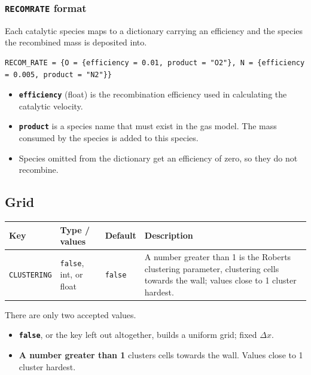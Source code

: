 \documentclass[10pt,a4paper]{article}
\renewcommand{\_}{\origunderscore\penalty4000\relax}
\begin{document}
\subsubsection*{\texttt{RECOM\_RATE} format}

Each catalytic species maps to a dictionary carrying an efficiency and the species the recombined mass is deposited into.

\begin{lstlisting}
RECOM_RATE = {O = {efficiency = 0.01, product = "O2"}, N = {efficiency = 0.005, product = "N2"}}
\end{lstlisting}

\begin{itemize}
    \item \textbf{\texttt{efficiency}} (float) is the recombination efficiency used in calculating the catalytic velocity.
    \item \textbf{\texttt{product}} is a species name that must exist in the gas model. The mass consumed by the species is added to this species.
    \item Species omitted from the dictionary get an efficiency of zero, so they do not recombine.
\end{itemize}

\subsection*{Grid}

\begin{center}
    \begin{tabular}{@{}lL{30mm}lL{80mm}@{}}
    \toprule
    \textbf{Key} & \textbf{Type / values} & \textbf{Default} & \textbf{Description} \\
    \midrule
    \texttt{CLUSTERING} & \texttt{false}, int, or float & \texttt{false} & A number greater than 1 is the Roberts clustering parameter, clustering cells towards the wall; values close to 1 cluster hardest. \\
    \bottomrule
    \end{tabular}
\end{center}

There are only two accepted values.

\begin{itemize}
    \item \textbf{\texttt{false}}, or the key left out altogether, builds a uniform grid; fixed $\Delta x$.
    \item \textbf{A number greater than 1} clusters cells towards the wall. Values close to 1 cluster hardest.
\end{itemize}
\end{document}
